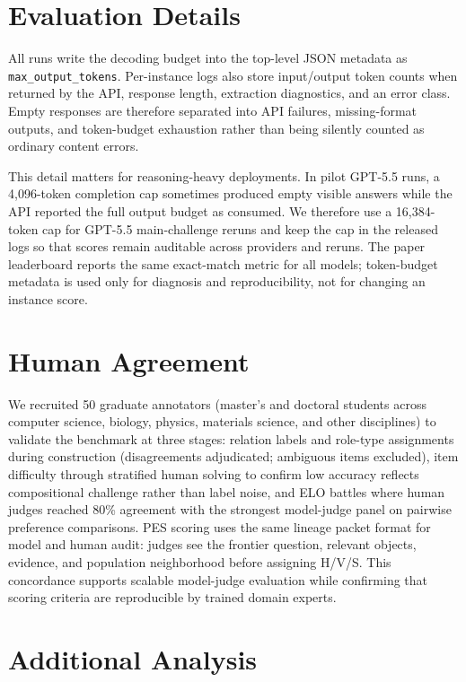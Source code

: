 \section{Evaluation Details}
\label{app:eval_logging}

All \geneexam{} runs write the decoding budget into the top-level JSON metadata as \texttt{max\_output\_tokens}. Per-instance logs also store input/output token counts when returned by the API, response length, extraction diagnostics, and an error class. Empty responses are therefore separated into API failures, missing-format outputs, and token-budget exhaustion rather than being silently counted as ordinary content errors.

This detail matters for reasoning-heavy deployments. In pilot GPT-5.5 runs, a 4,096-token completion cap sometimes produced empty visible answers while the API reported the full output budget as consumed. We therefore use a 16,384-token cap for GPT-5.5 main-challenge reruns and keep the cap in the released logs so that scores remain auditable across providers and reruns. The paper leaderboard reports the same exact-match metric for all models; token-budget metadata is used only for diagnosis and reproducibility, not for changing an instance score.


\section{Human Agreement}
We recruited 50 graduate annotators (master’s and doctoral students across
computer science, biology, physics, materials science, and other disciplines) to validate the benchmark
at three stages: \genomediff{} relation labels and role-type assignments during construction (disagreements adjudicated; ambiguous items excluded), \geneexam{} item difficulty through stratified
human solving to confirm low accuracy reflects compositional challenge rather than label noise, and
\genearena{} ELO battles where human judges reached 80\% agreement with the strongest model-judge panel on pairwise preference comparisons. PES scoring uses the same lineage packet format for model and human audit: judges see the frontier question, relevant \genome{} objects, \genomediff{} evidence, and population neighborhood before assigning H/V/S. This concordance supports scalable model-judge evaluation while confirming that scoring criteria are reproducible by trained domain experts.

\section{Additional \genearena{} Analysis}
\label{app:arena_analysis}

